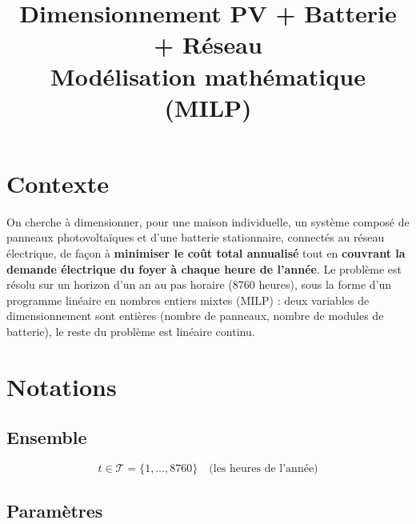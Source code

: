 \documentclass[11pt]{article}
\title{Dimensionnement PV + Batterie + Réseau\\
\large Modélisation mathématique (MILP)}
\author{}
\date{}
\begin{document}
\maketitle

\section{Contexte}

On cherche à dimensionner, pour une maison individuelle, un système composé de panneaux
photovoltaïques et d'une batterie stationnaire, connectés au réseau électrique, de façon à
\textbf{minimiser le coût total annualisé} tout en \textbf{couvrant la demande électrique du
foyer à chaque heure de l'année}. Le problème est résolu sur un horizon d'un an au pas
horaire (8760 heures), sous la forme d'un programme linéaire en nombres entiers mixtes
(MILP) : deux variables de dimensionnement sont entières (nombre de panneaux, nombre de
modules de batterie), le reste du problème est linéaire continu.

\section{Notations}

\subsection{Ensemble}

\[
t \in \mathcal{T} = \{1, \dots, 8760\} \quad \text{(les heures de l'année)}
\]

\subsection{Paramètres}
\end{document}
